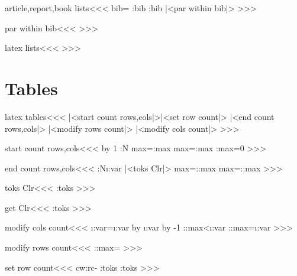 {\<article,report,book lists\><<<
%
   {\IgnorePar\EndP
    \let\en:bib=\empty}
   {\en:bib}
   {\en:bib\def\en:bib{\HCode{</bibl>}}%
      |<par within bib|>} 
   {}
>>>


\<par within bib\><<<
   {} 
   {}    
   {} {}
>>>





\<latex lists\><<<
>>>



\section{Tables}


\<latex tables\><<<
   {|<start count rows,cols|>|<set row count|>%
    }
   {%
     |<end count rows,cols|>}
   {|<modify rows count|>}
   {}
   {|<modify cols count|>%
    }
   {}
\HAssign{}
>>>

\<start count rows,cols\><<<
\gHAdvance\tabularN by 1  \PushStack\tabular:N\tabularN
\let\prevR:max=\R:max  \let\prevC:max=\C:max  \gHAssign\C:max=0
>>>

\<end count rows,cols\><<<
\PopStack\tabular:N\i:var |<toks Clr|>%
\global\let\R:max=\prevR:max  \global\let\C:max=\prevC:max 
>>>



\<toks Clr\><<<
\expandafter\tmp:toks\expandafter{\Clr}%
>>>

\<get Clr\><<<
\the\tmp:toks
>>>





\<modify cols count\><<<
\HAssign\i:var=\HCol \HAdvance\i:var by \HMultispan
\HAdvance\i:var by -1  \ifnum \C:max<\i:var \gHAssign\C:max=\i:var \fi
>>>

\<modify rows count\><<<
\gHAssign\R:max=\HRow
>>>

\<set row count\><<<
\expandafter\ifx \csname  cw:rc-\tabularN\endcsname \relax 
        \tmp:toks{ }%
\else
   \expandafter\expandafter\expandafter\tmp:toks
      \expandafter\expandafter{}%
\fi
>>>

}
